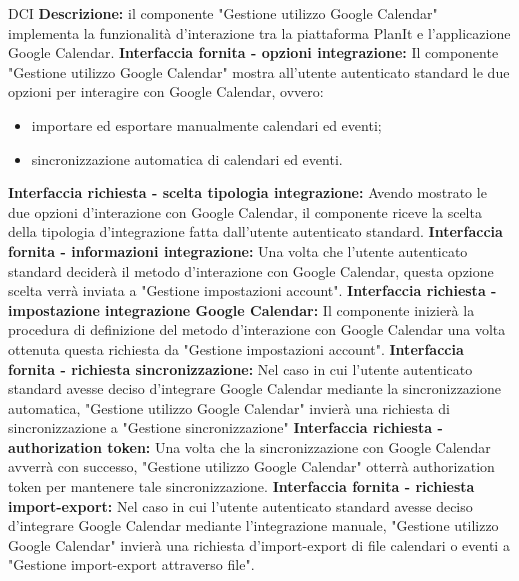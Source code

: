 \begin{listaPersonale}{DCI}
    \textbf{Descrizione:} il componente "Gestione utilizzo Google Calendar" implementa la funzionalità d'interazione tra la piattaforma PlanIt e l'applicazione Google Calendar.
    \textbf{Interfaccia fornita - opzioni integrazione:} Il componente "Gestione utilizzo Google Calendar" mostra all'utente autenticato standard le due opzioni per interagire con Google Calendar, ovvero:
    \begin{itemize}
        \item importare ed esportare manualmente calendari ed eventi;
        \item sincronizzazione automatica di calendari ed eventi.
    \end{itemize}
    \textbf{Interfaccia richiesta - scelta tipologia integrazione:} Avendo mostrato le due opzioni d'interazione con Google Calendar, il componente riceve la scelta della tipologia d'integrazione fatta dall'utente autenticato standard.
    \textbf{Interfaccia fornita - informazioni integrazione:} Una volta che l'utente autenticato standard deciderà il metodo d'interazione con Google Calendar, questa opzione scelta verrà inviata a "Gestione impostazioni account".
    \textbf{Interfaccia richiesta - impostazione integrazione Google
        Calendar:} Il componente inizierà la procedura di definizione del metodo d'interazione con Google Calendar una volta ottenuta questa richiesta da "Gestione impostazioni account".
    \textbf{Interfaccia fornita - richiesta sincronizzazione:} Nel caso in cui l'utente autenticato standard avesse deciso d'integrare Google Calendar mediante la sincronizzazione automatica, "Gestione utilizzo Google Calendar" invierà una richiesta di sincronizzazione a "Gestione sincronizzazione"
    \textbf{Interfaccia richiesta - authorization token:} Una volta che la sincronizzazione con Google Calendar avverrà con successo, "Gestione utilizzo Google Calendar" otterrà authorization token per mantenere tale sincronizzazione.
    \textbf{Interfaccia fornita - richiesta import-export:}  Nel caso in cui l'utente autenticato standard avesse deciso d'integrare Google Calendar mediante l'integrazione manuale, "Gestione utilizzo Google Calendar" invierà una richiesta d'import-export di file calendari o eventi a "Gestione import-export attraverso file".



\end{listaPersonale}
